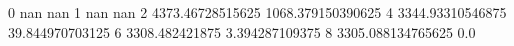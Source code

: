 0 nan nan
1 nan nan
2 4373.46728515625 1068.379150390625
4 3344.93310546875 39.844970703125
6 3308.482421875 3.394287109375
8 3305.088134765625 0.0
